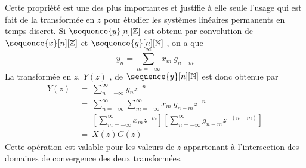 \begin{proposition}
{Cette propri\'{e}t\'{e} est une des plus importantes et justffie \`{a} elle seule l'usage qui est fait de la transform\'{e}e en $z$ pour \'{e}tudier les syst\`{e}mes lin\'{e}aires permanents en temps discret. Si $\sequence{y}[n][\zset]$ est obtenu par convolution de $\sequence{x}[n][\zset]$ et $\sequence{g}[n][\nset]$ , on a que
$$
y_n=\sum_{m=-\infty}^{\infty}x_m\ g_{n-m}
$$
La transform\'{e}e en $z,\ Y(z)$ , de $\sequence{y}[n][\nset]$ est donc obtenue par
\begin{align*}
Y(z)\ &=\ \sum_{n=-\infty}^{\infty} y_n z^{-n} \\
&=\ \sum_{n=-\infty}^{\infty}\sum_{m=-\infty}^{\infty} x_m\ g_{n-m}z^{-n} \\
&=\ [\sum_{m=-\infty}^{\infty} x_m z^{-m}][\sum_{n=-\infty}^{\infty}g_{n-m}z^{-(n-m)}] \\
&=\ X(z)G(z)
\end{align*}
Cette op\'{e}ration est valable pour les valeurs de $z$ appartenant \`{a} l'intersection des domaines de convergence des deux transform\'{e}es.

}
\end{proposition}
